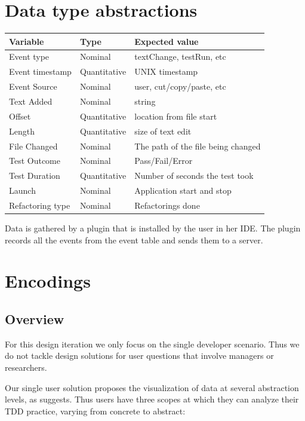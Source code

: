 \documentclass[journal]{vgtc}                %
\begin{document}
\section{Data type abstractions}
\label{sec:data}

\begin{table}[hbt]
\begin{tabular}{l l l}
\toprule
Variable & Type & Expected value \\
\midrule
Event type & Nominal & textChange, testRun, etc \\
Event timestamp & Quantitative & UNIX timestamp \\
Event Source & Nominal & user, cut/copy/paste, etc \\
Text Added & Nominal & string \\
Offset & Quantitative & location from file start \\
Length & Quantitative & size of text edit \\
File Changed & Nominal & The path of the file being changed \\
Test Outcome & Nominal & Pass/Fail/Error \\
Test Duration & Quantitative & Number of seconds the test took \\
Launch & Nominal & Application start and stop \\
Refactoring type & Nominal & Refactorings done \\
\bottomrule
\end{tabular}
\end{table}

Data is gathered by a plugin that is installed by the user in her IDE. The plugin records all the events from the event table and sends them to a server.

\section{Encodings}

\subsection{Overview}

For this design iteration we only focus on the single developer scenario. Thus we do not tackle design solutions for user questions that involve managers or researchers.

Our single user solution proposes the visualization of data at several abstraction levels, as \cite{two} suggests. Thus users have three scopes at which they can analyze their TDD practice, varying from concrete to abstract:
\end{document}
